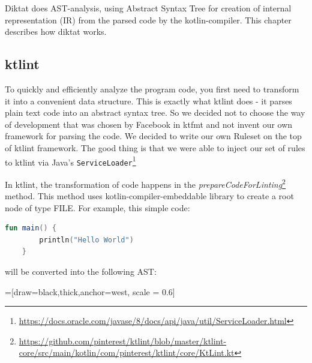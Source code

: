 Diktat does AST-analysis, using Abstract Syntax Tree for creation of internal representation (IR) from the parsed code by the kotlin-compiler. This chapter describes how diktat works.

\subsection{ktlint}
To quickly and efficiently analyze the program code, you first need to transform it into a convenient data structure. This is exactly what ktlint does - it parses plain text code into an abstract syntax tree. So we decided not to choose the way of development that was chosen by Facebook in ktfmt and not invent our own framework for parsing the code. We decided to write our own Ruleset on the top of ktlint framework. The good thing is that we were able to inject our set of rules to ktlint via Java's \texttt{ServiceLoader}\footnote{\url{https://docs.oracle.com/javase/8/docs/api/java/util/ServiceLoader.html}}

 In ktlint, the transformation of code happens in the \textsl{prepareCodeForLinting}\footnote{\url{https://github.com/pinterest/ktlint/blob/master/ktlint-core/src/main/kotlin/com/pinterest/ktlint/core/KtLint.kt}} method. This method uses kotlin-compiler-embeddable library to create a root node of type FILE.
For example, this simple code:
\begin{lstlisting}[caption={Simple function that will be transformed to AST}, label={lst:example1}, language=Kotlin]
	fun main() {
		println("Hello World")
	}
\end{lstlisting}

will be converted into the following AST:

=[draw=black,thick,anchor=west, scale = 0.6]

